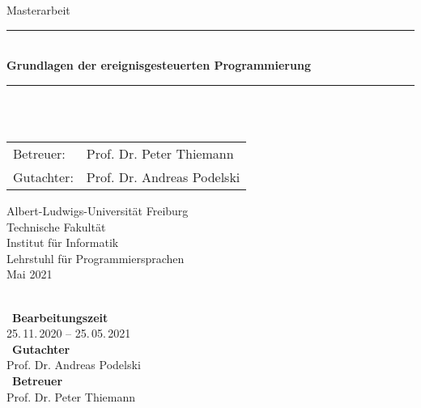 \begin{titlepage}
\begin{center}

\newcommand{\HorizontalLine}{\rule{\linewidth}{0.3mm}}

{\Large Masterarbeit}\\[1.3cm]


\HorizontalLine \\[0.4cm]
{ \huge \bfseries Grundlagen der ereignisgesteuerten Programmierung }
\HorizontalLine \\[1.5cm]


{\Huge \theauthor} \\[2cm]


\begin{tabular}[hc]{>{\huge}l >{\huge}l}
  Betreuer: & Prof. Dr. Peter Thiemann \\[0.3cm]
  Gutachter: & Prof. Dr. Andreas Podelski \\[1.2cm]
\end{tabular}
\vfill  %

\Large {
    Albert-Ludwigs-Universität Freiburg\\
    Technische Fakultät\\
    Institut für Informatik\\
    Lehrstuhl für Programmiersprachen\\[1cm]

    Mai 2021
    \\
}
\end{center}
\end{titlepage}

\thispagestyle{empty}
\ \vfill \ \\  %
\
\textbf{Bearbeitungszeit}            \smallskip{} \\
25.\,11.\,2020 -- 25.\,05.\,2021   \bigskip{} \\
\
\textbf{Gutachter}                  \smallskip{} \\
Prof. Dr. Andreas Podelski               \bigskip{} \\
\
\textbf{Betreuer}                  \smallskip{} \\
Prof. Dr. Peter Thiemann
